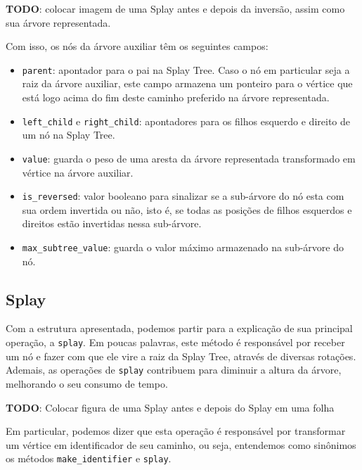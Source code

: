 \begin{center}
    \textbf{TODO}: colocar imagem de uma Splay antes e depois da inversão, assim como sua árvore representada.
\end{center}

Com isso, os nós da árvore auxiliar têm os seguintes campos:

\begin{itemize}
    \item \texttt{parent}: apontador para o pai na Splay Tree. Caso o nó em particular seja a raiz da árvore auxiliar, este campo armazena um ponteiro para o vértice que está logo acima do fim deste caminho preferido na árvore representada.
    \item \texttt{left\_child} e \texttt{right\_child}: apontadores para os filhos esquerdo e direito de um nó na Splay Tree.
    \item \texttt{value}: guarda o peso de uma aresta da árvore representada transformado em vértice na árvore auxiliar.
    \item \texttt{is\_reversed}: valor booleano para sinalizar se a sub-árvore do nó esta com sua ordem invertida ou não, isto é, se todas as posições de filhos esquerdos e direitos estão  invertidas nessa  sub-árvore.
    \item \texttt{max\_subtree\_value}: guarda o valor máximo armazenado na sub-árvore do nó.
\end{itemize}

\subsection{Splay}
\label{subsection:lct-splay-splay}

Com a estrutura apresentada, podemos partir para a explicação de sua principal operação, a \texttt{splay}. Em poucas palavras, este método é responsável por receber um nó e fazer com que ele vire a raiz da Splay Tree, através de diversas rotações.  Ademais, as operações de \texttt{splay} contribuem para diminuir a altura da árvore, melhorando o seu consumo de tempo.

\begin{center}
    \textbf{TODO}: Colocar figura de uma Splay antes e depois do Splay em uma folha
\end{center}

Em particular, podemos dizer que esta operação é responsável por transformar um vértice em identificador de seu caminho, ou seja, entendemos como sinônimos os métodos \texttt{make\_identifier} e \texttt{splay}.

